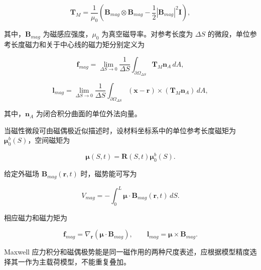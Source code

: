 \begin{equation}
\label{eq:rod-1-43}
\mathbf{T}_{M} = \frac{1}{\mu_{0}}\left( \mathbf{B}_{mag} \otimes \mathbf{B}_{mag} - \frac{1}{2}\left| \mathbf{B}_{mag} \right|^{2}\mathbf{I} \right),
\end{equation}

其中，\(\mathbf{B}_{mag}\) 为磁感应强度，\(\mu_{0}\) 为真空磁导率。对参考长度为 \(\Delta S\) 的微段，单位参考长度磁力和关于中心线的磁力矩分别定义为

\begin{equation}
\label{eq:rod-1-44}
\mathbf{f}_{mag} = \lim_{\Delta S \rightarrow 0}\frac{1}{\Delta S}\int_{\partial\Omega_{\Delta S}}^{}\mathbf{T}_{M}\mathbf{n}_{A}\, dA,
\end{equation}

\begin{equation}
\label{eq:rod-1-45}
\mathbf{l}_{mag} = \lim_{\Delta S \rightarrow 0}\frac{1}{\Delta S}\int_{\partial\Omega_{\Delta S}}^{}\left( \mathbf{x} - \mathbf{r} \right) \times \left( \mathbf{T}_{M}\mathbf{n}_{A} \right)\, dA,
\end{equation}

其中，\(\mathbf{n}_{A}\) 为闭合积分曲面的单位外法向量。

当磁性微段可由磁偶极近似描述时，设材料坐标系中的单位参考长度磁矩为 \(\bm{\mu}_{0}^{b}(S)\)，空间磁矩为\cite{Jackson1998Electrodynamics,Abbott2020MagneticRobotics}

\begin{equation}
\label{eq:rod-1-46}
\bm{\mu}(S,t) = \mathbf{R}(S,t)\bm{\mu}_{0}^{b}(S).
\end{equation}

给定外磁场 \(\mathbf{B}_{mag}\left( \mathbf{r},t \right)\) 时，磁势能可写为

\begin{equation}
\label{eq:rod-1-47}
V_{mag} = - \int_{0}^{L}\bm{\mu} \cdot \mathbf{B}_{mag}\left( \mathbf{r},t \right)\, dS.
\end{equation}

相应磁力和磁力矩为

\begin{equation}
\label{eq:rod-1-48}
\mathbf{f}_{mag} = \nabla_{\mathbf{r}}\left( \bm{\mu} \cdot \mathbf{B}_{mag} \right),\quad\quad\mathbf{l}_{mag} = \bm{\mu} \times \mathbf{B}_{mag}.
\end{equation}

Maxwell 应力积分和磁偶极势能是同一磁作用的两种尺度表述，应根据模型精度选择其一作为主载荷模型，不能重复叠加。

